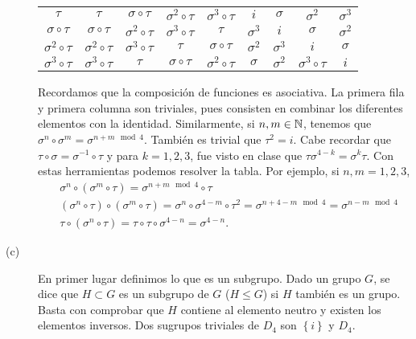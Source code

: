 \documentclass{article}
\begin{document}
\begin{sol}
\begin{description}
\begin{center}
\begin{tabular}{c | c | c | c | c | c | c | c | c |}
		$\displaystyle \tau $ & $\displaystyle \tau $ & $\displaystyle \sigma \circ \tau $ & $\displaystyle \sigma^{2} \circ \tau $ & $\displaystyle \sigma^{3} \circ \tau $ & $\displaystyle i $ & $\displaystyle \sigma  $ & $\displaystyle \sigma^{2} $ & $\displaystyle \sigma^{3} $ \\
		$\displaystyle \sigma\circ\tau $ & $\displaystyle \sigma\circ\tau $ & $\displaystyle \sigma^{2}\circ\tau $ & $\displaystyle \sigma^{3}\circ\tau $ & $\displaystyle \tau $ & $\displaystyle \sigma^{3} $ & $\displaystyle i $ & $\displaystyle \sigma $ & $\displaystyle \sigma^{2} $ \\
		$\displaystyle \sigma^{2}\circ\tau $ & $\displaystyle \sigma^{2}\circ\tau $ & $\displaystyle \sigma^{3}\circ\tau $ & $\displaystyle \tau $ & $\displaystyle \sigma\circ\tau $ & $\displaystyle \sigma^{2} $ & $\displaystyle \sigma^{3} $ & $\displaystyle i $ & $\displaystyle \sigma $ \\
		$\displaystyle \sigma^{3}\circ\tau $ & $\displaystyle \sigma^{3}\circ\tau $ & $\displaystyle \tau $ & $\displaystyle \sigma\circ\tau $ & $\displaystyle \sigma^{2}\circ\tau $ & $\displaystyle \sigma  $ & $\displaystyle \sigma^{2} $ & $\displaystyle \sigma^{3}\circ\tau $ & $\displaystyle i $  
	\end{tabular}
	\end{center}		
Recordamos que la composición de funciones es asociativa. La primera fila y primera columna son triviales, pues consisten en combinar los diferentes elementos con la identidad. Similarmente, si $\displaystyle n, m \in \mathbb{N} $, tenemos que $\displaystyle \sigma^{n} \circ \sigma^{m} = \sigma^{n + m \mod 4} $. También es trivial que $\displaystyle \tau^{2} = i $.
Cabe recordar que $\displaystyle \tau\circ\sigma = \sigma^{-1}\circ\tau $ y para $\displaystyle k = 1, 2, 3 $, fue visto en clase que $\displaystyle \tau\sigma^{4 - k} = \sigma^{k}\tau $. Con estas herramientas podemos resolver la tabla. Por ejemplo, si $\displaystyle n, m = 1, 2, 3 $,
\[
\begin{split}
& \sigma^{n} \circ \left( \sigma^{m} \circ \tau \right) = \sigma^{n + m \mod 4} \circ \tau \\
& \left(\sigma^{n}\circ\tau\right)\circ\left(\sigma^{m}\circ\tau\right) = \sigma^{n}\circ\sigma^{4-m}\circ\tau^{2} = \sigma^{n + 4 - m \mod 4} = \sigma^{n - m \mod 4} \\
& \tau \circ \left(\sigma^{n}\circ\tau\right) = \tau \circ \tau \circ \sigma^{4 - n} = \sigma^{4 - n}.
\end{split}
\]
\item[(c)] En primer lugar definimos lo que es un subgrupo. Dado un grupo $\displaystyle G $, se dice que $\displaystyle H \subset G $ es un subgrupo de $\displaystyle G $ ($\displaystyle H \leq G $) si $\displaystyle H $ también es un grupo. Basta con comprobar que $\displaystyle H $ contiene al elemento neutro y existen los elementos inversos. Dos sugrupos triviales de $\displaystyle D_{4} $ son $\displaystyle \left\{ i\right\}  $ y $\displaystyle D_{4} $. \\ 

\end{description}
\end{sol}
\end{document}
